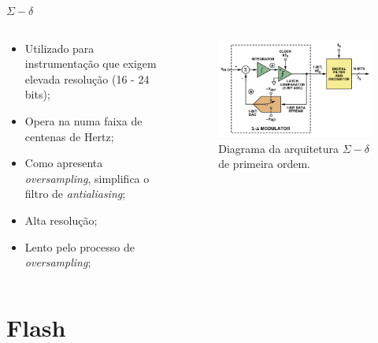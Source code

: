 \documentclass{beamer}
\begin{document}
\begin{frame}{$\Sigma - \delta$}
\begin{columns}
    \begin{column}{0.50\textwidth}
		\begin{itemize}
			\item Utilizado para instrumentação que exigem elevada resolução (16 - 24 bits);
			\item Opera na numa faixa de centenas de Hertz;
			\item Como apresenta \textit{oversampling},  simplifica o filtro de \textit{antialiasing};
			\item Alta resolução;
			\item Lento pelo processo de \textit{oversampling};
		\end{itemize}
    \end{column}

    \begin{column}{0.5\textwidth}
		\begin{figure}[H]
		    \centering
		    \begin{center}
		    \includegraphics[width=\textwidth]{img/sigma}
		  \caption{Diagrama da arquitetura $\Sigma - \delta$ de primeira ordem.}
		    \label{fig:sar}
		  \end{center}
		\end{figure}
    \end{column}
\end{columns}
\end{frame}



\section{Flash}
\end{document}
